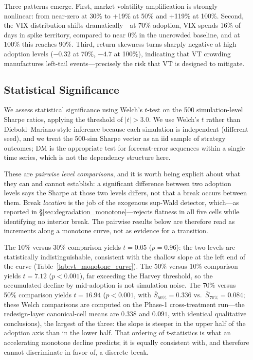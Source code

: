 \documentclass[12pt,a4paper]{article}
\begin{document}
Three patterns emerge. First, market volatility amplification is strongly nonlinear: from near-zero at 30\% to $+$19\% at 50\% and $+$119\% at 100\%. Second, the VIX distribution shifts dramatically---at 70\% adoption, VIX spends 16\% of days in spike territory, compared to near 0\% in the uncrowded baseline, and at 100\% this reaches 90\%. Third, return skewness turns sharply negative at high adoption levels ($-0.32$ at 70\%, $-4.7$ at 100\%), indicating that VT crowding manufactures left-tail events---precisely the risk that VT is designed to mitigate.

\subsection{Statistical Significance}

We assess statistical significance using Welch's $t$-test on the 500 simulation-level Sharpe ratios, applying the \citet{harvey2016} threshold of $|t| > 3.0$. We use Welch's $t$ rather than Diebold--Mariano-style inference because each simulation is independent (different seed), and we treat the 500-sim Sharpe vector as an iid sample of strategy outcomes; DM is the appropriate test for forecast-error sequences within a single time series, which is not the dependency structure here.

These are \emph{pairwise level comparisons}, and it is worth being explicit about what they can and cannot establish: a significant difference between two adoption levels says the Sharpe at those two levels differs, not that a break occurs between them. Break \emph{location} is the job of the exogenous sup-Wald detector, which---as reported in \S\ref{sec:degradation_monotone}---rejects flatness in all five cells while identifying no interior break. The pairwise results below are therefore read as increments along a monotone curve, not as evidence for a transition.

The 10\% versus 30\% comparison yields $t = 0.05$ ($p = 0.96$): the two levels are statistically indistinguishable, consistent with the shallow slope at the left end of the curve (Table~\ref{tab:vt_monotone_curve}). The 50\% versus 10\% comparison yields $t = 7.12$ ($p < 0.001$), far exceeding the Harvey threshold, so the accumulated decline by mid-adoption is not simulation noise. The 70\% versus 50\% comparison yields $t = 16.94$ ($p < 0.001$, with $\bar{S}_{50\%} = 0.336$ vs.\ $\bar{S}_{70\%} = 0.084$; these Welch comparisons are computed on the Phase-1 cross-treatment run---the redesign-layer canonical-cell means are $0.338$ and $0.091$, with identical qualitative conclusions), the largest of the three: the slope is steeper in the upper half of the adoption axis than in the lower half. That ordering of $t$-statistics is what an accelerating monotone decline predicts; it is equally consistent with, and therefore cannot discriminate in favor of, a discrete break.
\end{document}
